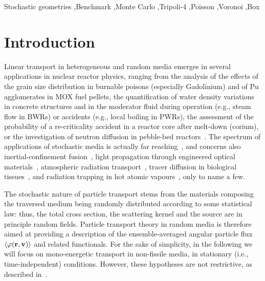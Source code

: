 \documentclass[final,authoryear,5p,times,twocolumn]{elsarticle}
\begin{document}
\begin{frontmatter}
\begin{keyword}
Stochastic geometries \sep Benchmark \sep Monte Carlo \sep {\sc Tripoli-4}\textsuperscript{ \textregistered} \sep Poisson \sep Voronoi \sep Box
\end{keyword}

\end{frontmatter}


\section{Introduction}

Linear transport in heterogeneous and random media emerges in several applications in nuclear reactor physics, ranging from the analysis of the effects of the grain size distribution in burnable poisons (especially Gadolinium) and of Pu agglomerates in MOX fuel pellets, the quantification of water density variations in concrete structures and in the moderator fluid during operation (e.g., steam flow in BWRs) or accidents (e.g., local boiling in PWRs), the assessment of the probability of a re-criticality accident in a reactor core after melt-down (corium), or the investigation of neutron diffusion in pebble-bed reactors~\cite{pomraning, larsen, zimmerman}. The spectrum of applications of stochastic media is actually far reaching~\cite{santalo, kendall, torquato, bouchaud}, and concerns also inertial-confinement fusion~\cite{haran}, light propagation through engineered optical materials~\cite{NatureOptical, PREOptical, PREQuenched}, atmospheric radiation transport~\cite{davis, kostinski, clouds}, tracer diffusion in biological tissues~\cite{tuchin}, and radiation trapping in hot atomic vapours~\cite{NatureVapours}, only to name a few.

The stochastic nature of particle transport stems from the materials composing the traversed medium being randomly distributed according to some statistical law: thus, the total cross section, the scattering kernel and the source are in principle random fields. Particle transport theory in random media is therefore aimed at providing a description of the ensemble-averaged angular particle flux $\langle \varphi({\bf r}, {\bf v}) \rangle$ and related functionals. For the sake of simplicity, in the following we will focus on mono-energetic transport in non-fissile media, in stationary (i.e., time-independent) conditions. However, these hypotheses are not restrictive, as described in~\cite{pomraning}.
\end{document}
